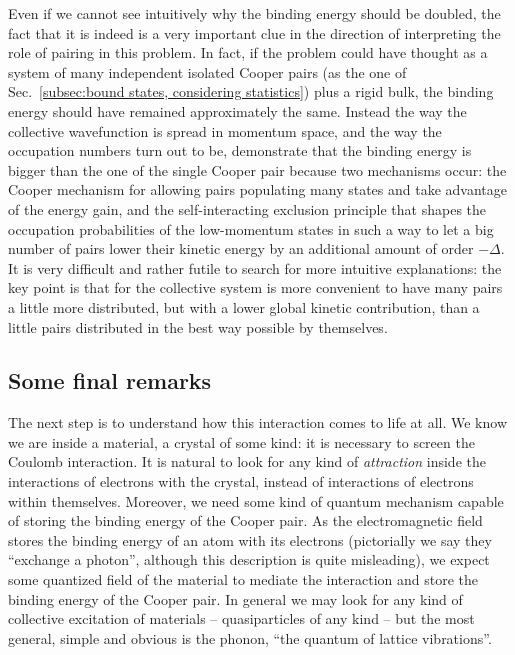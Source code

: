 Even if we cannot see intuitively why the binding energy should be doubled, the fact that it is indeed is a very important clue in the direction of interpreting the role of pairing in this problem. In fact, if the problem could have thought as a system of many independent isolated Cooper pairs (as the one of Sec.~\ref{subsec:bound states, considering statistics}) plus a rigid bulk, the binding energy should have remained approximately the same. Instead the way the collective wavefunction is spread in momentum space, and the way the occupation numbers turn out to be, demonstrate that the binding energy is bigger than the one of the single Cooper pair because two mechanisms occur: the Cooper mechanism for allowing pairs populating many states and take advantage of the energy gain, and the self-interacting exclusion principle that shapes the occupation probabilities of the low-momentum states in such a way to let a big number of pairs lower their kinetic energy by an additional amount of order $-\Delta$. It is very difficult and rather futile to search for more intuitive explanations: the key point is that for the collective system is more convenient to have many pairs a little more distributed, but with a lower global kinetic contribution, than a little pairs distributed in the best way possible by themselves.

\subsection{Some final remarks}

The next step is to understand how this interaction comes to life at all. We know we are inside a material, a crystal of some kind: it is necessary to screen the Coulomb interaction. It is natural to look for any kind of \textit{attraction} inside the interactions of electrons with the crystal, instead of interactions of electrons within themselves. Moreover, we need some kind of quantum mechanism capable of storing the binding energy of the Cooper pair. As the electromagnetic field stores the binding energy of an atom with its electrons (pictorially we say they ``exchange a photon'', although this description is quite misleading), we expect some quantized field of the material to mediate the interaction and store the binding energy of the Cooper pair. In general we may look for any kind of collective excitation of materials -- quasiparticles of any kind -- but the most general, simple and obvious is the phonon, ``the quantum of lattice vibrations''.

